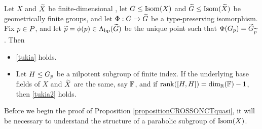 {\begin{proposition}
\label{propositionCROSSONCTquasi}
Let $X$ and $\widetilde X$ be finite-dimensional \CROSSs, let $G\leq\operatorname{Isom}(X)$ and $\widetilde G\leq \operatorname{Isom}(\widetilde X)$ be geometrically finite groups, and let $\Phi:G\to\widetilde G$ be a type-preserving isomorphism. Fix $p\in P$, and let $\widetilde{p} = \phi(p)\in \Lambda_{\mathrm{bp}}(\widetilde G)$ be the unique point such that $\Phi(G_p) = \widetilde G_{\widetilde{p}}$. Then
\begin{itemize}
\item[(i)] \eqref{tukia} holds.
\item[(ii)] Let $H\leq G_p$ be a nilpotent subgroup of finite index. If the underlying base fields of $X$ and $\widetilde X$ are the same, say $\F$, and if $\rank([H,H]) = \dim_\R(\F) - 1$, then \eqref{tukia2} holds.
\end{itemize}
\end{proposition}

Before we begin the proof of Proposition \ref{propositionCROSSONCTquasi}, it will be necessary to understand the structure of a parabolic subgroup of $\operatorname{Isom}(X)$.

}
